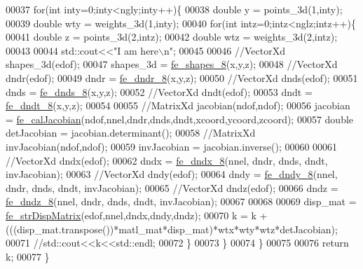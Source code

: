 \begin{DoxyCode}
00037         \textcolor{keywordflow}{for}(\textcolor{keywordtype}{int} inty=0;inty<ngly;inty++)\{
00038             \textcolor{keywordtype}{double} y = points\_3d(1,inty);
00039             \textcolor{keywordtype}{double} wty = weights\_3d(1,inty); 
00040             \textcolor{keywordflow}{for}(\textcolor{keywordtype}{int} intz=0;intz<nglz;intz++)\{
00041                 \textcolor{keywordtype}{double} z = points\_3d(2,intz);
00042                 \textcolor{keywordtype}{double} wtz = weights\_3d(2,intz);
00043                 
00044                 std::cout<<\textcolor{stringliteral}{"I am here\(\backslash\)n"};
00045 
00046                 \textcolor{comment}{//VectorXd shapes\_3d(edof);}
00047                 shapes\_3d = \hyperlink{functions_8h_ab77a3a6d6f6b436d7e8c600bb0869927}{fe\_shapes\_8}(x,y,z);
00048                 \textcolor{comment}{//VectorXd dndr(edof);}
00049                 dndr = \hyperlink{functions_8h_afc547bef246c057db6cbd04bf7f866a9}{fe\_dndr\_8}(x,y,z);
00050                 \textcolor{comment}{//VectorXd dnds(edof);}
00051                 dnds = \hyperlink{functions_8h_ac0b5524525e1f2e89bb064c15ab8e664}{fe\_dnds\_8}(x,y,z);
00052                 \textcolor{comment}{//VectorXd dndt(edof);}
00053                 dndt = \hyperlink{functions_8h_a57e8e5c9f740c98e4767f29c121c2d0a}{fe\_dndt\_8}(x,y,z);
00054 
00055                 \textcolor{comment}{//MatrixXd jacobian(ndof,ndof);}
00056                 jacobian = \hyperlink{functions_8h_a5ae3771e65b4a0d177097041a4349c28}{fe\_calJacobian}(ndof,nnel,dndr,dnds,dndt,xcoord,ycoord,zcoord);
00057                 \textcolor{keywordtype}{double} detJacobian = jacobian.determinant();
00058                 \textcolor{comment}{//MatrixXd invJacobian(ndof,ndof);}
00059                 invJacobian = jacobian.inverse();
00060 
00061                 \textcolor{comment}{//VectorXd dndx(edof);}
00062                 dndx = \hyperlink{functions_8h_afc6be1a5667e68156cb099e8da71170f}{fe\_dndx\_8}(nnel, dndr, dnds, dndt, invJacobian);
00063                 \textcolor{comment}{//VectorXd dndy(edof);}
00064                 dndy = \hyperlink{functions_8h_a0572d7818e085c67f7fbb84eef8ecfb4}{fe\_dndy\_8}(nnel, dndr, dnds, dndt, invJacobian);
00065                 \textcolor{comment}{//VectorXd dndz(edof);}
00066                 dndz = \hyperlink{functions_8h_aaf75db8433433807839c6ea17f2cf72c}{fe\_dndz\_8}(nnel, dndr, dnds, dndt, invJacobian);
00067 
00068                 
00069                 disp\_mat = \hyperlink{functions_8h_a4b49d2df4f86e7d0755971ab4bfa48b2}{fe\_strDispMatrix}(edof,nnel,dndx,dndy,dndz);
00070                 k = k + (((disp\_mat.transpose())*matl\_mat*disp\_mat)*wtx*wty*wtz*detJacobian);
00071                 \textcolor{comment}{//std::cout<<k<<std::endl;}
00072             \}
00073         \}
00074     \}
00075     
00076     \textcolor{keywordflow}{return} k;
00077 \}   
\end{DoxyCode}
